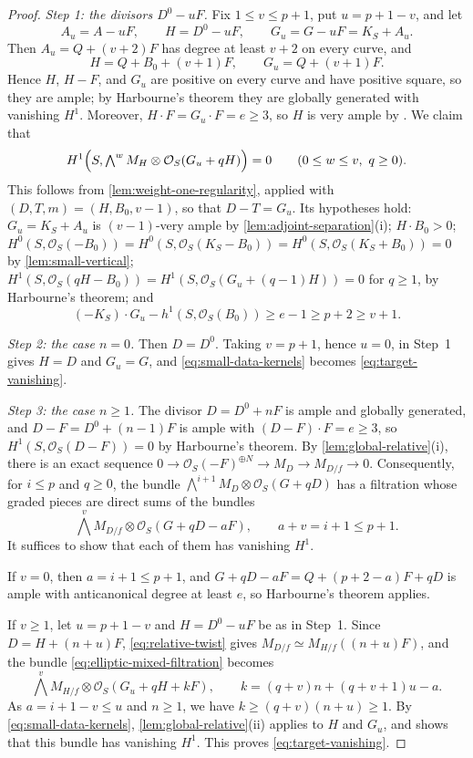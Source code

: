 \documentclass[11pt,reqno]{amsart}
\numberwithin{equation}{section}
\theoremstyle{remark}
\newcommand{\sshf}[1]{\mathcal{O}_{#1}}
\begin{document}
\begin{proof}
\smallskip\noindent\emph{Step 1: the divisors \(D^0-uF\).} Fix \(1\leq v\leq p+1\), put \(u=p+1-v\), and let
\[
 A_u=A-uF,\qquad H=D^0-uF,\qquad G_u=G-uF=K_S+A_u.
\]
Then \(A_u=Q+(v+2)F\) has degree at least \(v+2\) on every curve, and
\[
 H=Q+B_0+(v+1)F,\qquad G_u=Q+(v+1)F.
\]
Hence \(H\), \(H-F\), and \(G_u\) are positive on every curve and have positive square, so they are ample; by Harbourne's theorem they are globally generated with vanishing \(H^1\). Moreover, \(H\cdot F=G_u\cdot F=e\geq3\), so \(H\) is very ample by \cite[Theorem 1.3]{GP01}. We claim that
\begin{equation}\label{eq:small-data-kernels}
 H^1\Bigl(S,\textstyle\bigwedge^wM_H\otimes\sshf{S}(G_u+qH)\Bigr)=0
 \qquad(0\leq w\leq v,\ q\geq0).
\end{equation}
This follows from \cref{lem:weight-one-regularity}, applied with \((D,T,m)=(H,B_0,v-1)\), so that \(D-T=G_u\). Its hypotheses hold: \(G_u=K_S+A_u\) is \((v-1)\)-very ample by \cref{lem:adjoint-separation}\textup{(i)}; \(H\cdot B_0>0\); \(H^0(S,\sshf{S}(-B_0))=H^0(S,\sshf{S}(K_S-B_0))=H^0(S,\sshf{S}(K_S+B_0))=0\) by \cref{lem:small-vertical}; \(H^1(S,\sshf{S}(qH-B_0))=H^1(S,\sshf{S}(G_u+(q-1)H))=0\) for \(q\geq1\), by Harbourne's theorem; and
\[
 (-K_S)\cdot G_u-h^1(S,\sshf{S}(B_0))\geq e-1\geq p+2\geq v+1.
\]

\smallskip\noindent\emph{Step 2: the case \(n=0\).} Then \(D=D^0\). Taking \(v=p+1\), hence \(u=0\), in Step~1 gives \(H=D\) and \(G_u=G\), and \eqref{eq:small-data-kernels} becomes \eqref{eq:target-vanishing}.

\smallskip\noindent\emph{Step 3: the case \(n\geq1\).} The divisor \(D=D^0+nF\) is ample and globally generated, and \(D-F=D^0+(n-1)F\) is ample with \((D-F)\cdot F=e\geq3\), so \(H^1(S,\sshf{S}(D-F))=0\) by Harbourne's theorem. By \cref{lem:global-relative}\textup{(i)}, there is an exact sequence \(0\to\sshf{S}(-F)^{\oplus N}\to M_D\to M_{D/f}\to0\). Consequently, for \(i\leq p\) and \(q\geq0\), the bundle \(\bigwedge^{i+1}M_D\otimes\sshf{S}(G+qD)\) has a filtration whose graded pieces are direct sums of the bundles
\begin{equation}\label{eq:elliptic-mixed-filtration}
 \textstyle\bigwedge^vM_{D/f}\otimes\sshf{S}(G+qD-aF),\qquad a+v=i+1\leq p+1.
\end{equation}
It suffices to show that each of them has vanishing \(H^1\).

If \(v=0\), then \(a=i+1\leq p+1\), and \(G+qD-aF=Q+(p+2-a)F+qD\) is ample with anticanonical degree at least \(e\), so Harbourne's theorem applies.

If \(v\geq1\), let \(u=p+1-v\) and \(H=D^0-uF\) be as in Step~1. Since \(D=H+(n+u)F\), \eqref{eq:relative-twist} gives \(M_{D/f}\simeq M_{H/f}((n+u)F)\), and the bundle \eqref{eq:elliptic-mixed-filtration} becomes
\[
 \textstyle\bigwedge^vM_{H/f}\otimes\sshf{S}(G_u+qH+kF),\qquad
 k=(q+v)n+(q+v+1)u-a.
\]
As \(a=i+1-v\leq u\) and \(n\geq1\), we have \(k\geq(q+v)(n+u)\geq1\). By \eqref{eq:small-data-kernels}, \cref{lem:global-relative}\textup{(ii)} applies to \(H\) and \(G_u\), and shows that this bundle has vanishing \(H^1\). This proves \eqref{eq:target-vanishing}.
\end{proof}
\end{document}
